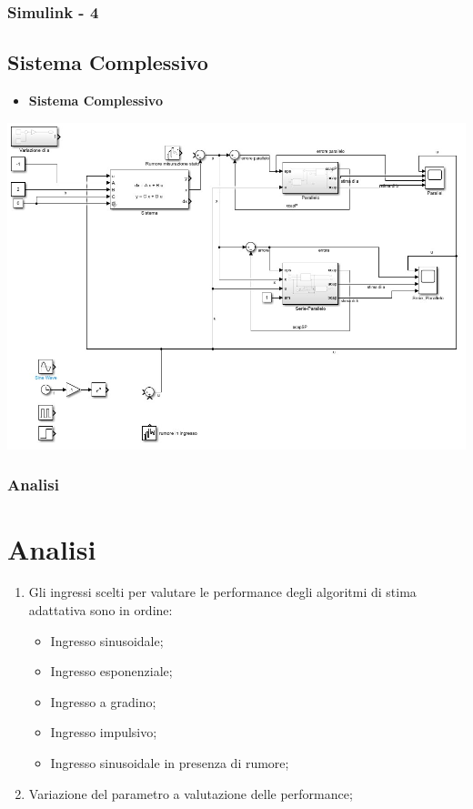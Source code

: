 \documentclass{beamer}
\begin{document}
\begin{frame}
    \frametitle{Simulink - 4}
    \subsection{Sistema Complessivo}
    \begin{itemize}
        \item \textbf{Sistema Complessivo}
    \end{itemize}
    \begin{center}
        \includegraphics[scale=0.3]{Complessivo.jpg}%
    \end{center}
\end{frame}
\begin{frame}
    \frametitle{Analisi}
    \section{Analisi}
       \begin{enumerate}
           \item Gli ingressi scelti per valutare le performance degli algoritmi di stima adattativa sono in ordine:
           \begin{itemize}
               \item Ingresso sinusoidale;
               \item Ingresso esponenziale;
               \item Ingresso a gradino;
               \item Ingresso impulsivo;
               \item Ingresso sinusoidale in presenza di rumore;
           \end{itemize}
           \item Variazione del parametro a valutazione delle performance;
       \end{enumerate}
\end{frame}
\end{document}
